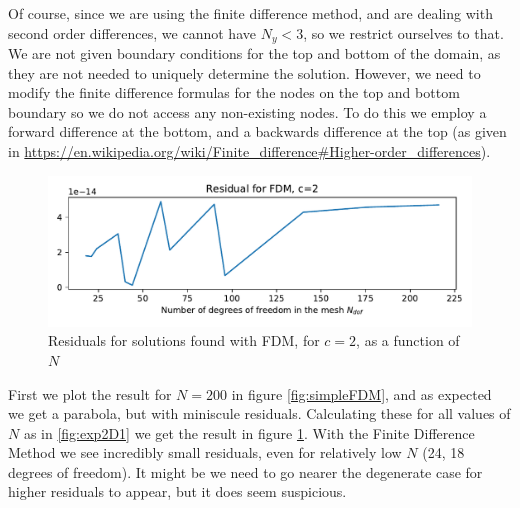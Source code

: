 \documentclass[sigconf]{acmart}
\begin{document}
Of course, since we are using the finite difference method, and are dealing with second order differences, we cannot have $ N_y<3 $, so we restrict ourselves to that. We are not given boundary conditions for the top and bottom of the domain, as they are not needed to uniquely determine the solution. However, we need to modify the finite difference formulas for the nodes on the top and bottom boundary so we do not access any non-existing nodes. To do this we employ a forward difference at the bottom, and a backwards difference at the top (as given in \url{https://en.wikipedia.org/wiki/Finite_difference#Higher-order_differences}). 
\begin{figure}[b]
	\includegraphics[width=\linewidth]{exFDM.pdf}
	\caption{Residuals for solutions found with FDM, for $ c=2 $, as a function of $ N $}
	\label{fig:exFDM}
\end{figure}
First we plot the result for $ N = 200 $ in figure \ref{fig:simpleFDM}, and as expected we get a parabola, but with miniscule residuals. Calculating these for all values of $ N $ as in \ref{fig:exp2D1} we get the result in figure \ref{fig:exFDM}. With the Finite Difference Method we see incredibly small residuals, even for relatively low $ N $ (24, 18 degrees of freedom). It might be we need to go nearer the degenerate case for higher residuals to appear, but it does seem suspicious.
\end{document}
